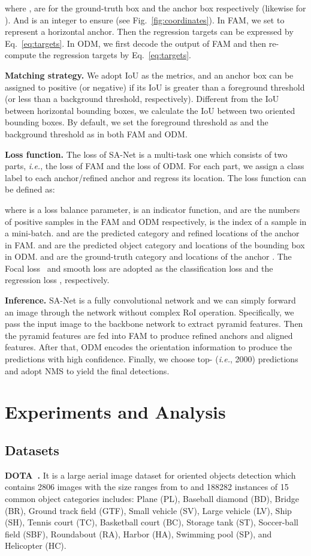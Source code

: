 \documentclass[10pt,journal,final]{IEEEtran}
\def\ie{{\em i.e.}}
\begin{document}
where ,  are for the ground-truth box and the anchor box respectively (likewise for ). And  is an integer to ensure  (see Fig.~\ref{fig:coordinates}). In FAM, we set  to represent a horizontal anchor. Then the regression targets can be expressed by Eq.~\eqref{eq:targets}. In ODM, we first decode the output of FAM and then re-compute the regression targets by Eq.~\eqref{eq:targets}. 

{\bf Matching strategy.} We adopt IoU as the metrics, and an anchor box can be assigned to positive (or negative) if its IoU is greater than a foreground threshold (or less than a background threshold, respectively). Different from the IoU between horizontal bounding boxes, we calculate the IoU between two oriented bounding boxes. By default, we set the foreground threshold as  and the background threshold as  in both FAM and ODM.

{\bf Loss function.} The loss of SA-Net is a multi-task one which consists of two parts, \ie, the loss of FAM and the loss of ODM. For each part, we assign a class label to each anchor/refined anchor and regress its location. The loss function can be defined as:

where  is a loss balance parameter,  is an indicator function,  and  are the numbers of positive samples in the FAM and ODM respectively,  is the index of a sample in a mini-batch.  and  are the predicted category and refined locations of the anchor  in FAM.  and  are the predicted object category and locations of the bounding box in ODM.  and  are the ground-truth category and locations of the anchor . The Focal loss~\cite{lin2017focal} and smooth  loss are adopted as the classification loss  and the regression loss , respectively.

{\bf Inference.} SA-Net is a fully convolutional network and we can simply forward an image through the network without complex RoI operation. Specifically, we pass the input image to the backbone network to extract pyramid features. Then the pyramid features are fed into FAM to produce refined anchors and aligned features. After that, ODM encodes the orientation information to produce the predictions with high confidence. Finally, we choose top- (\ie, 2000) predictions and adopt NMS to yield the final detections.

\section{Experiments and Analysis}
\label{sec:experiments}
\subsection{Datasets}
\label{sec:dataset}
{\bf DOTA~\cite{xia2018dota}.} It is a large aerial image dataset for oriented objects detection which contains 2806 images with the size ranges from  to  and 188282 instances of 15 common object categories includes: Plane (PL), Baseball diamond (BD), Bridge (BR), Ground track field (GTF), Small vehicle (SV), Large vehicle (LV), Ship (SH), Tennis court (TC), Basketball court (BC), Storage tank (ST), Soccer-ball field (SBF), Roundabout (RA), Harbor (HA), Swimming pool (SP), and Helicopter (HC).
\end{document}
